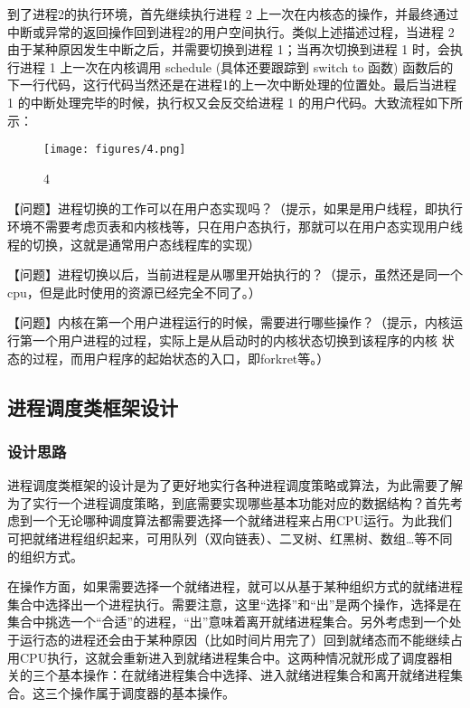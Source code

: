 到了进程2的执行环境，首先继续执行进程 2
上一次在内核态的操作，并最终通过中断或异常的返回操作回到进程2的用户空间执行。类似上述描述过程，当进程
2 由于某种原因发生中断之后，并需要切换到进程 1；当再次切换到进程 1
时，会执行进程 1 上一次在内核调用 schedule (具体还要跟踪到 switch to
函数)
函数后的下一行代码，这行代码当然还是在进程1的上一次中断处理的位置处。最后当进程
1 的中断处理完毕的时候，执行权又会反交给进程 1
的用户代码。大致流程如下所示：

\begin{figure}[htbp]
\centering
\texttt{[image: figures/4.png]}
\caption{4}
\end{figure}

【问题】进程切换的工作可以在用户态实现吗？（提示，如果是用户线程，即执行环境不需要考虑页表和内核栈等，只在用户态执行，那就可以在用户态实现用户线程的切换，这就是通常用户态线程库的实现）

【问题】进程切换以后，当前进程是从哪里开始执行的？（提示，虽然还是同一个cpu，但是此时使用的资源已经完全不同了。）

【问题】内核在第一个用户进程运行的时候，需要进行哪些操作？（提示，内核运行第一个用户进程的过程，实际上是从启动时的内核状态切换到该程序的内核
状态的过程，而用户程序的起始状态的入口，即forkret等。）

\subsection{进程调度类框架设计}\label{ux8fdbux7a0bux8c03ux5ea6ux7c7bux6846ux67b6ux8bbeux8ba1}

\subsubsection{设计思路}\label{ux8bbeux8ba1ux601dux8def}

进程调度类框架的设计是为了更好地实行各种进程调度策略或算法，为此需要了解为了实行一个进程调度策略，到底需要实现哪些基本功能对应的数据结构？首先考虑到一个无论哪种调度算法都需要选择一个就绪进程来占用CPU运行。为此我们可把就绪进程组织起来，可用队列（双向链表）、二叉树、红黑树、数组\ldots{}等不同的组织方式。

在操作方面，如果需要选择一个就绪进程，就可以从基于某种组织方式的就绪进程集合中选择出一个进程执行。需要注意，这里``选择''和``出''是两个操作，选择是在集合中挑选一个``合适''的进程，``出''意味着离开就绪进程集合。另外考虑到一个处于运行态的进程还会由于某种原因（比如时间片用完了）回到就绪态而不能继续占用CPU执行，这就会重新进入到就绪进程集合中。这两种情况就形成了调度器相关的三个基本操作：在就绪进程集合中选择、进入就绪进程集合和离开就绪进程集合。这三个操作属于调度器的基本操作。

